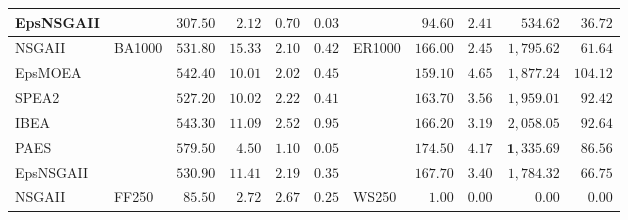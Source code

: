 \begin{table}
{\begin{tabular}{
        |l||
        l|
        r
        r|
        r
        r
        ||l|
        r
        r|
        r
        r|
      }
      EpsNSGAII  &                           & $307.50$                         & $2.12$                           & $0.70$          & $0.03$                           &                                 & $94.60$           & $2.41$          & $534.62$            & $36.72$          \\
      \hline
      NSGAII     & \multirow{6}{*}{ BA1000 } & $531.80$                         & $15.33$                          & $2.10$          & $0.42$                           & \multirow{6}{*}{ ER1000 }       & $166.00$          & $2.45$          & $1,795.62$          & $61.64$          \\
      EpsMOEA    &                           & $542.40$                         & $10.01$                          & $2.02$          & $0.45$                           &                                 & $159.10$          & $4.65$          & $1,877.24$          & $104.12$         \\
      SPEA2      &                           & $527.20$                         & $10.02$                          & $2.22$          & $0.41$                           &                                 & $163.70$          & $3.56$          & $1,959.01$          & $92.42$          \\
      IBEA       &                           & $543.30$                         & $11.09$                          & $2.52$          & $0.95$                           &                                 & $166.20$          & $3.19$          & $2,058.05$          & $92.64$          \\
      PAES       &                           & $\mathbf{579.50}$                & $\mathbf{4.50}$                  & $\mathbf{1.10}$ & $0.05$                           &                                 & $\mathbf{174.50}$ & $\mathbf{4.17}$ & $\mathbf{1,335.69}$ & $\mathbf{86.56}$ \\
      EpsNSGAII  &                           & $530.90$                         & $11.41$                          & $2.19$          & $0.35$                           &                                 & $167.70$          & $3.40$          & $1,784.32$          & $66.75$          \\
      \hline
      NSGAII     & \multirow{6}{*}{ FF250 }  & $85.50$                          & $2.72$                           & $2.67$          & $0.25$                           & \multirow{6}{*}{ WS250 }        & $1.00$            & $0.00$          & $0.00$              & $0.00$           \\

\end{tabular}}
\end{table}
